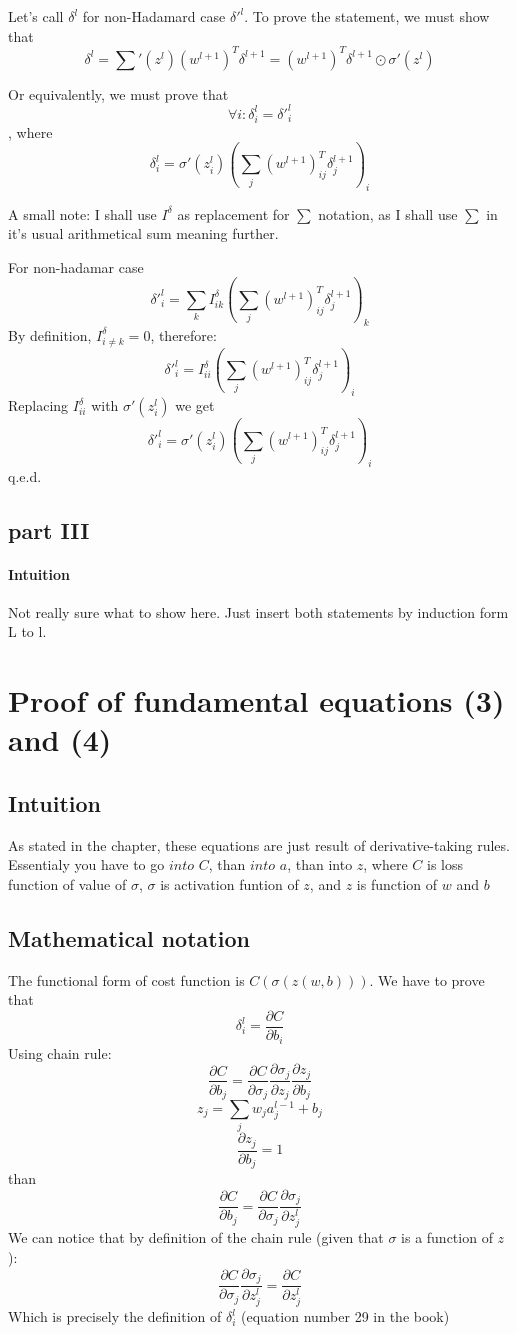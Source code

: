 \documentclass{article}
\begin{document}
Let's call $\delta^l$ for non-Hadamard case $\delta'^l$.
To prove the statement, we must show that 
$$\delta^l = {\sum}'(z^l) (w^{l+1})^{T} \delta^{l+1} = (w^{l+1})^{T} \delta^{l+1}\odot\sigma'(z^l)$$

Or equivalently, we must prove that $$\forall i: \delta^l_i = \delta'^l_i$$, where 
$$\delta^l_i = \sigma'(z_i^l) (\sum_j(w^{l+1})^T_{ij} \delta^{l+1}_j)_i$$

A small note: I shall use $I^{\delta}$ as replacement for $\sum$ notation, as I shall use $\sum$ in it's usual arithmetical sum meaning further.

For non-hadamar case
$$\delta'^l_i = \sum_k I^{\delta}_{ik} (\sum_j(w^{l+1})^T_{ij} \delta^{l+1}_j)_k$$
By definition, $I^{\delta}_{i \neq k} = 0$, therefore:
$$\delta'^l_i = I^{\delta}_{ii} (\sum_j(w^{l+1})^T_{ij} \delta^{l+1}_j)_i$$
Replacing $I^{\delta}_{ii}$ with $\sigma'(z_i^l)$ we get 
$$\delta'^l_i = \sigma'(z_i^l) (\sum_j(w^{l+1})^T_{ij} \delta^{l+1}_j)_i$$
q.e.d.

\subsection{part III}
\paragraph{Intuition}
Not really sure what to show here. Just insert both statements by induction form L to l.


\section{Proof of fundamental equations (3) and (4)}
\subsection{Intuition}
As stated in the chapter, these equations are just result of derivative-taking rules.
Essentialy you have to go $into$ $C$, than $into$ $a$, than into $z$, where $C$ is loss function of value of $\sigma$, $\sigma$ is activation funtion of $z$, and $z$ is function of $w$ and $b$
\subsection{Mathematical notation}
The functional form of cost function is $C(\sigma(z(w,b)))$.
We have to prove that 
$$\delta^l_i = \frac{\partial C}{\partial b_i}$$
Using chain rule:
$$\frac{\partial C}{\partial b_j} = \frac{\partial C}{\partial \sigma_j} \frac{\partial \sigma_j}{\partial z_j} \frac{\partial z_j}{\partial b_j}$$
$$z_j = \sum_jw_ja_j^{l-1} + b_j$$
$$\frac{\partial z_j}{\partial b_j} = 1$$
than 
$$\frac{\partial C}{\partial b_j} = \frac{\partial C}{\partial \sigma_j} \frac{\partial \sigma_j}{\partial z^l_j}$$
We can notice that by definition of the chain rule (given that $\sigma$ is a function of $z$):
$$\frac{\partial C}{\partial \sigma_j} \frac{\partial \sigma_j}{\partial z^l_j} = \frac{\partial C}{\partial z^l_j}$$
Which is precisely the definition of $\delta^l_i$ (equation number 29 in the book)
\end{document}
